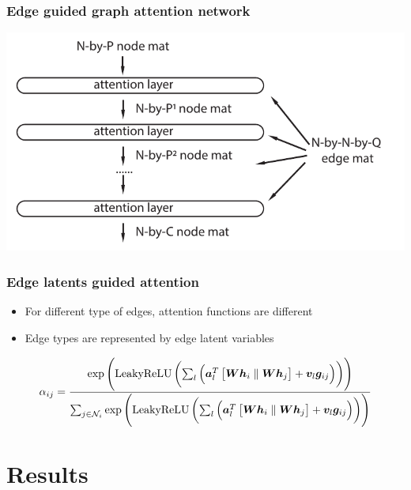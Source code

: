 \documentclass[compress]{beamer}
\begin{document}
\begin{frame}
  \frametitle{Edge guided graph attention network}
  \begin{center}
    \includegraphics[scale=0.8]{egat_overview.pdf}
  \end{center}
\end{frame}

\begin{frame}
  \frametitle{Edge latents guided attention}
  \begin{itemize}
  \item For different type of edges, attention functions are different
  \item Edge types are represented by edge latent variables
  \end{itemize}
  \begin{center}
    \begin{displaymath}
      \alpha_{ij}=\frac{\exp\left(\mathrm{LeakyReLU}\left(\sum_l\left(\vectorsym{a}_l^T\left[\matrixsym{W}\vectorsym{h}_i\parallel{}\matrixsym{W}\vectorsym{h}_j\right]+\vectorsym{v}_l\vectorsym{g}_{ij}\right)\right)\right)}{\sum_{j\in\mathcal{N}_i}\exp\left(\mathrm{LeakyReLU}\left(\sum_l\left(\vectorsym{a}_l^T\left[\matrixsym{W}\vectorsym{h}_i\parallel{}\matrixsym{W}\vectorsym{h}_j\right]+\vectorsym{v}_l\vectorsym{g}_{ij}\right)\right)\right)}
    \end{displaymath}
  \end{center}
\end{frame}

\section{Results}
\end{document}
